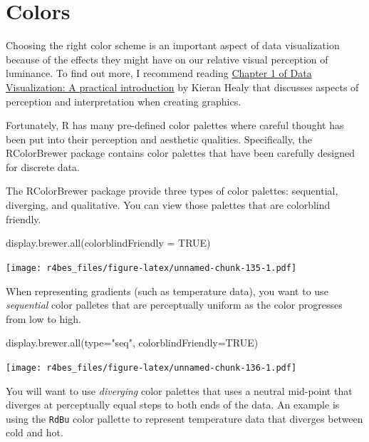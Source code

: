 \documentclass[
]{book}
\newenvironment{Shaded}{\begin{snugshade}}{\end{snugshade}}
\newcommand{\AttributeTok}[1]{\textcolor[rgb]{0.77,0.63,0.00}{#1}}
\newcommand{\ConstantTok}[1]{\textcolor[rgb]{0.00,0.00,0.00}{#1}}
\newcommand{\FunctionTok}[1]{\textcolor[rgb]{0.00,0.00,0.00}{#1}}
\newcommand{\NormalTok}[1]{#1}
\newcommand{\StringTok}[1]{\textcolor[rgb]{0.31,0.60,0.02}{#1}}
\begin{document}
\hypertarget{colors}{%
\section{Colors}\label{colors}}

Choosing the right color scheme is an important aspect of data visualization because of the effects they might have on our relative visual perception of luminance. To find out more, I recommend reading \href{https://socviz.co/lookatdata.html\#lookatdata}{Chapter 1 of Data Visualization: A practical introduction} by Kieran Healy \citep{healy_data_2018} that discusses aspects of perception and interpretation when creating graphics.

Fortunately, R has many pre-defined color palettes where careful thought has been put into their perception and aesthetic qualities. Specifically, the RColorBrewer package contains color palettes that have been carefully designed for discrete data.

The RColorBrewer package provide three types of color palettes: sequential, diverging, and qualitative. You can view those palettes that are colorblind friendly.

\begin{Shaded}
\begin{Highlighting}[]
\FunctionTok{display.brewer.all}\NormalTok{(}\AttributeTok{colorblindFriendly =} \ConstantTok{TRUE}\NormalTok{)}
\end{Highlighting}
\end{Shaded}

\texttt{[image: r4bes\_files/figure-latex/unnamed-chunk-135-1.pdf]}

When representing gradients (such as temperature data), you want to use \emph{sequential} color palletes that are perceptually uniform as the color progresses from low to high.

\begin{Shaded}
\begin{Highlighting}[]
\FunctionTok{display.brewer.all}\NormalTok{(}\AttributeTok{type=}\StringTok{"seq"}\NormalTok{, }\AttributeTok{colorblindFriendly=}\ConstantTok{TRUE}\NormalTok{)}
\end{Highlighting}
\end{Shaded}

\texttt{[image: r4bes\_files/figure-latex/unnamed-chunk-136-1.pdf]}

You will want to use \emph{diverging} color palettes that uses a neutral mid-point that diverges at perceptually equal steps to both ends of the data. An example is using the \texttt{RdBu} color pallette to represent temperature data that diverges between cold and hot.
\end{document}
